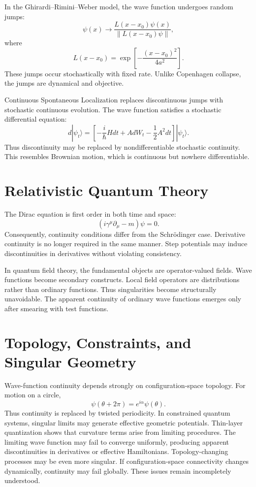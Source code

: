 \documentclass[11pt]{article}
\begin{document}
In the Ghirardi–Rimini–Weber model, the wave function undergoes random jumps:
\[
\psi(x) \to
\frac{L(x-x_0)\psi(x)}{\|L(x-x_0)\psi\|},
\]
where
\[
L(x-x_0)=
\exp\left[-\frac{(x-x_0)^2}{4a^2}\right].
\]
These jumps occur stochastically with fixed rate.
Unlike Copenhagen collapse, the jumps are dynamical and objective.

Continuous Spontaneous Localization
replaces discontinuous jumps with stochastic continuous evolution.
The wave function satisfies a stochastic differential equation:
\[
d|\psi_t\rangle
=
\left[
-\frac{i}{\hbar}Hdt
+AdW_t
-\frac12 A^2dt
\right]|\psi_t\rangle.
\]
Thus discontinuity may be replaced by nondifferentiable stochastic continuity.
This resembles Brownian motion, which is continuous but nowhere differentiable.

\section{ Relativistic Quantum Theory}

The Dirac equation is first order in both time and space:
\[
(i\gamma^\mu\partial_\mu-m)\psi=0.
\]
Consequently, continuity conditions differ from the Schrödinger case.
Derivative continuity is no longer required in the same manner.
Step potentials may induce discontinuities in derivatives without violating consistency.

In quantum field theory, the fundamental objects are operator-valued fields.
Wave functions become secondary constructs.
Local field operators are distributions rather than ordinary functions.
Thus singularities become structurally unavoidable.
The apparent continuity of ordinary wave functions emerges only after smearing with test functions.

\section{ Topology, Constraints, and Singular Geometry}

Wave-function continuity depends strongly on configuration-space topology.
For motion on a circle,
\[
\psi(\theta+2\pi)=e^{i\alpha}\psi(\theta).
\]
Thus continuity is replaced by twisted periodicity.
In constrained quantum systems, singular limits may generate 
effective geometric potentials.
Thin-layer quantization shows that curvature terms arise from limiting procedures.
The limiting wave function may fail to converge uniformly, producing 
apparent discontinuities in derivatives or effective Hamiltonians.
Topology-changing processes may be even more singular.
If configuration-space connectivity changes dynamically, continuity may fail globally.
These issues remain incompletely understood.
\end{document}
